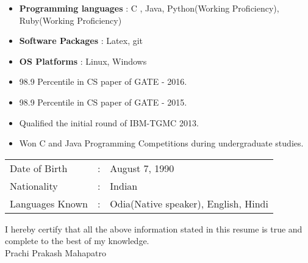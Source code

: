 \documentclass[10pt]{article}
\newcommand{\shadethis}[1]{ \begin{snugshade}#1\end{snugshade}}
\begin{document}
\begin{description}[style=nextline]
\begin{itemize}
				
			\end{itemize}	
			
			
						
		\shadethis{\item{}}
		\begin{itemize}
			\item \textbf{Programming languages} : C , Java, Python(Working Proficiency), Ruby(Working Proficiency)
			\item \textbf{Software Packages} : Latex, git
			\item \textbf{OS Platforms} :	Linux, Windows
		\end{itemize}	
		
		\shadethis{\item{}}
		\begin{itemize}			
			
			
			\item 98.9 Percentile in CS paper of GATE - 2016.
			
			\item 98.9 Percentile in CS paper of GATE - 2015.
			
			\item Qualified the initial round  of IBM-TGMC 2013.
			
			\item Won C and Java Programming Competitions during undergraduate studies.
						
		\end{itemize}
		
		\shadethis{\item{}}
		\begin{tabular}{l c l}
			Date of Birth &:& August 7, 1990\\
			Nationality &:& Indian\\
			Languages Known &:& Odia(Native speaker), English, Hindi
		\end{tabular}
		
				
		
				
	\vspace*{3em}
	I hereby certify that all the above information stated in this resume is
	true and complete to the best of my knowledge.\\[0.1cm]
	\mbox{}\hfill Prachi Prakash Mahapatro
	\end{description}
\end{document}
